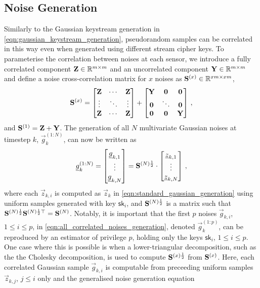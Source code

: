 \documentclass[conference]{IEEEtran}
\theoremstyle{definition}
\theoremstyle{remark}
\begin{document}
\subsection{Noise Generation}\label{subsec:noise_gen}
Similarly to the Gaussian keystream generation in \eqref{eqn:gaussian_keystream_generation}, pseudorandom samples can be correlated in this way even when generated using different stream cipher keys. To parameterise the correlation between noises at each sensor, we introduce a fully correlated component ${{\mathbf{Z}}}\in\mathbb{R}^{m\times m}$ and an uncorrelated component ${{\mathbf{Y}}}\in\mathbb{R}^{m\times m}$ and define a noise cross-correlation matrix for $x$ noises as ${{\mathbf{S}}}^{(x)} \in \mathbb{R}^{xm\times xm}$,
\begin{equation}\label{eqn:noise_correlation_matrix}
  \mat{S}^{(x)}=
  \begin{bmatrix}
    \mat{Z} & \cdots & \mat{Z}\\
    \vdots & \ddots & \vdots\\
    \mat{Z} & \cdots & \mat{Z}\\
  \end{bmatrix}+
  \begin{bmatrix}
    \mat{Y} & \mat{0} & \mat{0}\\
    \mat{0} & \ddots & \mat{0}\\
    \mat{0} & \mat{0} & \mat{Y}\\
  \end{bmatrix}\,,
\end{equation}
and ${{\mathbf{S}}}^{(1)}={{\mathbf{Z}}}+{{\mathbf{Y}}}$. The generation of all $N$ multivariate Gaussian noises at timestep $k$, $\vec{g}_k^{(1:N)}$, can now be written as
\begin{equation}\label{eqn:all_correlated_noises_generation}
  \vec{g}_k^{(1:N)}=
  \begin{bmatrix}
    \vec{g}_{k,1}\\
    \vdots\\
    \vec{g}_{k,N}
  \end{bmatrix}=
  \mat{S}^{(N)\frac{1}{2}}\cdot
  \begin{bmatrix}
    \vec{z}_{k,1}\\
    \vdots\\
    \vec{z}_{k,N}
  \end{bmatrix}\,,
\end{equation}
where each $\vec{z}_{k,i}$ is computed as $\vec{z}_k$ in \eqref{eqn:standard_gaussian_generation} using uniform samples generated with key $\mathsf{sk}_i$, and ${{\mathbf{S}}}^{(N)\frac{1}{2}}$ is a matrix such that ${{\mathbf{S}}}^{(N)\frac{1}{2}}{{\mathbf{S}}}^{(N)\frac{1}{2}\top}={{\mathbf{S}}}^{(N)}$. Notably, it is important that the first $p$ noises $\vec{g}_{k,i}$, $1\leq i \leq p$, in \eqref{eqn:all_correlated_noises_generation}, denoted $\vec{g}_k^{(1:p)}$, can be reproduced by an estimator of privilege $p$, holding only the keys $\mathsf{sk}_i$, $1\leq i \leq p$. One case where this is possible is when a lower-triangular decomposition, such as the the Cholesky decomposition, is used to compute ${{\mathbf{S}}}^{(x)\frac{1}{2}}$ from ${{\mathbf{S}}}^{(x)}$. Here, each correlated Gaussian sample $\vec{g}_{k,i}$ is computable from preceeding uniform samples $\vec{z}_{k,j}$, $j\leq i$ only and the generalised noise generation equation
\end{document}
